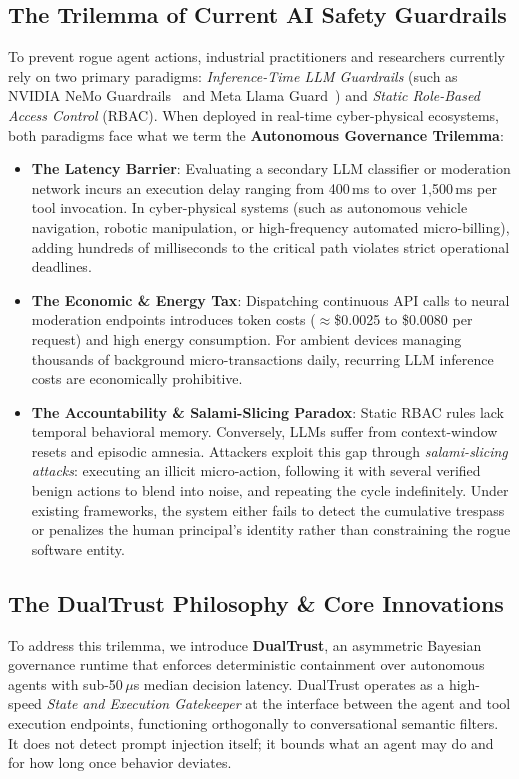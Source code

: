 \documentclass[manuscript, screen, review]{jair}
\begin{document}
\subsection{The Trilemma of Current AI Safety Guardrails}
To prevent rogue agent actions, industrial practitioners and researchers currently rely on two primary paradigms: \emph{Inference-Time LLM Guardrails} (such as NVIDIA NeMo Guardrails~\cite{rebedea2023nemo} and Meta Llama Guard~\cite{inan2023llama}) and \emph{Static Role-Based Access Control} (RBAC). When deployed in real-time cyber-physical ecosystems, both paradigms face what we term the \textbf{Autonomous Governance Trilemma}:
\begin{itemize}[leftmargin=12pt, topsep=2pt, itemsep=1pt]
\item \textbf{The Latency Barrier}: Evaluating a secondary LLM classifier or moderation network incurs an execution delay ranging from 400\,ms to over 1,500\,ms per tool invocation. In cyber-physical systems (such as autonomous vehicle navigation, robotic manipulation, or high-frequency automated micro-billing), adding hundreds of milliseconds to the critical path violates strict operational deadlines.
\item \textbf{The Economic \& Energy Tax}: Dispatching continuous API calls to neural moderation endpoints introduces token costs ($\approx$\$0.0025 to \$0.0080 per request) and high energy consumption. For ambient devices managing thousands of background micro-transactions daily, recurring LLM inference costs are economically prohibitive.
\item \textbf{The Accountability \& Salami-Slicing Paradox}: Static RBAC rules lack temporal behavioral memory. Conversely, LLMs suffer from context-window resets and episodic amnesia. Attackers exploit this gap through \emph{salami-slicing attacks}: executing an illicit micro-action, following it with several verified benign actions to blend into noise, and repeating the cycle indefinitely. Under existing frameworks, the system either fails to detect the cumulative trespass or penalizes the human principal's identity rather than constraining the rogue software entity.
\end{itemize}

\subsection{The DualTrust Philosophy \& Core Innovations}
To address this trilemma, we introduce \textbf{DualTrust}, an asymmetric Bayesian governance runtime that enforces deterministic containment over autonomous agents with sub-50\,$\mu$s median decision latency. DualTrust operates as a high-speed \emph{State and Execution Gatekeeper} at the interface between the agent and tool execution endpoints, functioning orthogonally to conversational semantic filters. It does not detect prompt injection itself; it bounds what an agent may do and for how long once behavior deviates.
\end{document}
